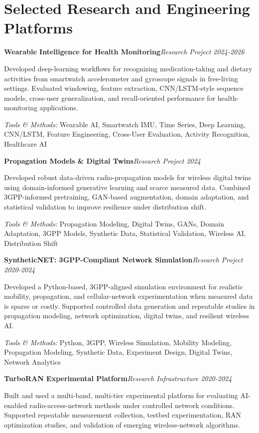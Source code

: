 \documentclass[9pt,letterpaper]{extarticle}
\newcommand{\entry}[2]{\Needspace{4\baselineskip}\textbf{#1}\hfill\textit{#2}\par}
\begin{document}
\section{Selected Research and Engineering Platforms}
\entry{Wearable Intelligence for Health Monitoring}{Research Project \textbar{} 2024-2026}
Developed deep-learning workflows for recognizing medication-taking and dietary activities from smartwatch accelerometer and gyroscope signals in free-living settings. Evaluated windowing, feature extraction, CNN/LSTM-style sequence models, cross-user generalization, and recall-oriented performance for health-monitoring applications.\par
{\small\textit{Tools \& Methods:} Wearable AI, Smartwatch IMU, Time Series, Deep Learning, CNN/LSTM, Feature Engineering, Cross-User Evaluation, Activity Recognition, Healthcare AI\par}
\vspace{1pt}
\entry{Propagation Models \& Digital Twins}{Research Project \textbar{} 2024}
Developed robust data-driven radio-propagation models for wireless digital twins using domain-informed generative learning and scarce measured data. Combined 3GPP-informed pretraining, GAN-based augmentation, domain adaptation, and statistical validation to improve resilience under distribution shift.\par
{\small\textit{Tools \& Methods:} Propagation Modeling, Digital Twins, GANs, Domain Adaptation, 3GPP Models, Synthetic Data, Statistical Validation, Wireless AI, Distribution Shift\par}
\vspace{1pt}
\entry{SyntheticNET: 3GPP-Compliant Network Simulation}{Research Project \textbar{} 2020-2024}
Developed a Python-based, 3GPP-aligned simulation environment for realistic mobility, propagation, and cellular-network experimentation when measured data is sparse or costly. Supported controlled data generation and repeatable studies in propagation modeling, network optimization, digital twins, and resilient wireless AI.\par
{\small\textit{Tools \& Methods:} Python, 3GPP, Wireless Simulation, Mobility Modeling, Propagation Modeling, Synthetic Data, Experiment Design, Digital Twins, Network Analytics\par}
\vspace{1pt}
\entry{TurboRAN Experimental Platform}{Research Infrastructure \textbar{} 2020-2024}
Built and used a multi-band, multi-tier experimental platform for evaluating AI-enabled radio-access-network methods under controlled network conditions. Supported repeatable measurement collection, testbed experimentation, RAN optimization studies, and validation of emerging wireless-network algorithms.\par
\end{document}
